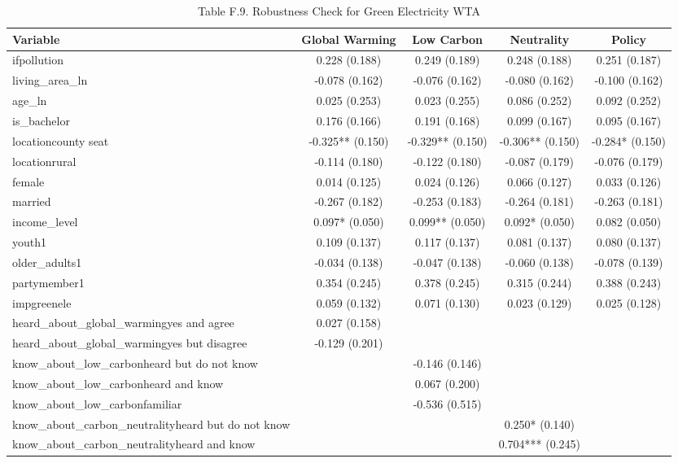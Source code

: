 \begin{table}[!htbp]
\centering
\caption{Table F.9. Robustness Check for Green Electricity WTA}
\begin{tabular}{lcccc}
\hline
Variable & Global Warming & Low Carbon & Neutrality & Policy \\
\hline
ifpollution & 0.228 (0.188) & 0.249 (0.189) & 0.248 (0.188) & 0.251 (0.187) \\
living\_area\_ln & -0.078 (0.162) & -0.076 (0.162) & -0.080 (0.162) & -0.100 (0.162) \\
age\_ln & 0.025 (0.253) & 0.023 (0.255) & 0.086 (0.252) & 0.092 (0.252) \\
is\_bachelor & 0.176 (0.166) & 0.191 (0.168) & 0.099 (0.167) & 0.095 (0.167) \\
locationcounty seat & -0.325** (0.150) & -0.329** (0.150) & -0.306** (0.150) & -0.284* (0.150) \\
locationrural & -0.114 (0.180) & -0.122 (0.180) & -0.087 (0.179) & -0.076 (0.179) \\
female & 0.014 (0.125) & 0.024 (0.126) & 0.066 (0.127) & 0.033 (0.126) \\
married & -0.267 (0.182) & -0.253 (0.183) & -0.264 (0.181) & -0.263 (0.181) \\
income\_level & 0.097* (0.050) & 0.099** (0.050) & 0.092* (0.050) & 0.082 (0.050) \\
youth1 & 0.109 (0.137) & 0.117 (0.137) & 0.081 (0.137) & 0.080 (0.137) \\
older\_adults1 & -0.034 (0.138) & -0.047 (0.138) & -0.060 (0.138) & -0.078 (0.139) \\
partymember1 & 0.354 (0.245) & 0.378 (0.245) & 0.315 (0.244) & 0.388 (0.243) \\
impgreenele & 0.059 (0.132) & 0.071 (0.130) & 0.023 (0.129) & 0.025 (0.128) \\
heard\_about\_global\_warmingyes and agree & 0.027 (0.158) &  &  &  \\
heard\_about\_global\_warmingyes but disagree & -0.129 (0.201) &  &  &  \\
know\_about\_low\_carbonheard but do not know &  & -0.146 (0.146) &  &  \\
know\_about\_low\_carbonheard and know &  & 0.067 (0.200) &  &  \\
know\_about\_low\_carbonfamiliar &  & -0.536 (0.515) &  &  \\
know\_about\_carbon\_neutralityheard but do not know &  &  & 0.250* (0.140) &  \\
know\_about\_carbon\_neutralityheard and know &  &  & 0.704*** (0.245) &  \\

\end{tabular}
\end{table}
